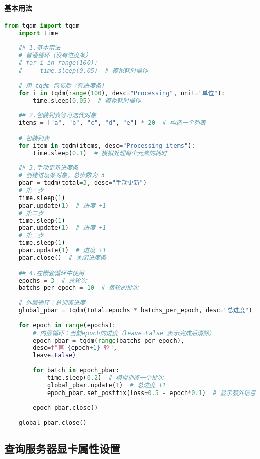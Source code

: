 \paragraph{基本用法}
\begin{lstlisting}[language=python,caption={示例},label=code:tqdb]
	from tqdm import tqdm
	import time
	
	## 1.基本用法
	# 普通循环（没有进度条）
	# for i in range(100):
	#     time.sleep(0.05)  # 模拟耗时操作
	
	# 用 tqdm 包装后（有进度条）
	for i in tqdm(range(100), desc="Processing", unit="单位"):
		time.sleep(0.05)  # 模拟耗时操作
		
	## 2.包装列表等可迭代对象
	items = ["a", "b", "c", "d", "e"] * 20  # 构造一个列表
	
	# 包装列表
	for item in tqdm(items, desc="Processing items"):
		time.sleep(0.1)  # 模拟处理每个元素的耗时
	
	## 3.手动更新进度条
	# 创建进度条对象，总步数为 3
	pbar = tqdm(total=3, desc="手动更新")
	# 第一步
	time.sleep(1)
	pbar.update(1)  # 进度 +1
	# 第二步
	time.sleep(1)
	pbar.update(1)  # 进度 +1
	# 第三步
	time.sleep(1)
	pbar.update(1)  # 进度 +1
	pbar.close()  # 关闭进度条
	
	## 4.在嵌套循环中使用
	epochs = 3  # 总轮次
	batchs_per_epoch = 10  # 每轮的批次
	
	# 外层循环：总训练进度
	global_pbar = tqdm(total=epochs * batchs_per_epoch, desc="总进度")
	
	for epoch in range(epochs):
		# 内层循环：当前epoch的进度（leave=False 表示完成后清除）
		epoch_pbar = tqdm(range(batchs_per_epoch), 
		desc=f"第 {epoch+1} 轮", 
		leave=False)
	
		for batch in epoch_pbar:
			time.sleep(0.2)  # 模拟训练一个批次
			global_pbar.update(1)  # 总进度 +1
			epoch_pbar.set_postfix(loss=0.5 - epoch*0.1)  # 显示额外信息（如损失）
		
		epoch_pbar.close()
		
	global_pbar.close()
\end{lstlisting}

\subsection{查询服务器显卡属性设置}


